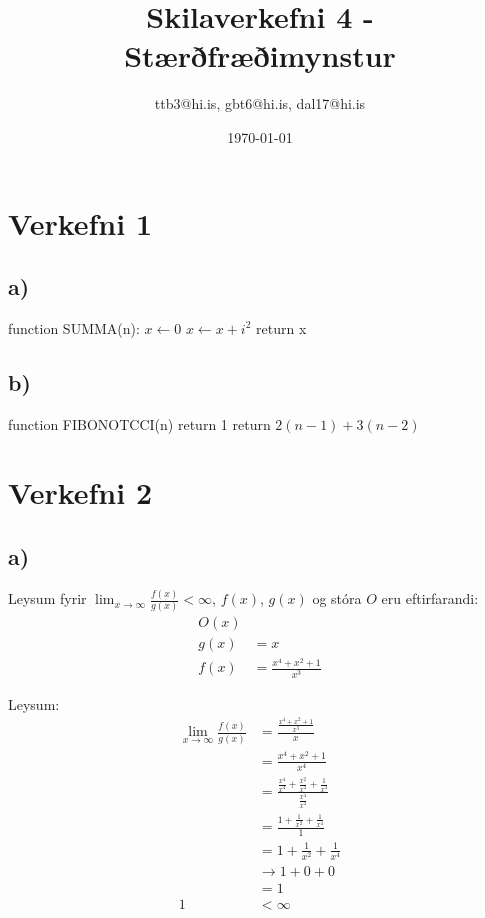 \documentclass{article}
\title{Skilaverkefni 4 - Stærðfræðimynstur}
\author{ttb3@hi.is, gbt6@hi.is, dal17@hi.is}
\date{\today}
\begin{document}
\maketitle

\section*{Verkefni 1}
\subsection*{a)}

\begin{algorithmic}
\State function SUMMA(n):
\State $x \gets 0$
    \State $x \gets x + i^2$
\EndFor
\State return x
\end{algorithmic}

\subsection*{b)}

\begin{algorithmic}
    \State function FIBONOTCCI(n)
        \State return 1
    \Else 
        \State return $2(n-1)+3(n-2)$
    \EndIf
\end{algorithmic}

\newpage
\section*{Verkefni 2}
\subsection*{a)}
Leysum fyrir $\lim_{x\to\infty} \frac{f(x)}{g(x)}<\infty$, $f(x)$, $g(x)$ og stóra $O$ eru eftirfarandi:
\begin{align*}
    O(x)\\
    g(x)&=x\\
    f(x)&=\frac{x^4+x^2+1}{x^3}
\end{align*}
    
Leysum:
\begin{align*}
    \lim_{x\to\infty} \frac{f(x)}{g(x)} 
    &= \frac{\frac{x^4+x^2+1}{x^3}}{x}\\
    &= \frac{x^4+x^2+1}{x^4}\\
    &= \frac{\frac{x^4}{x^4}+\frac{x^2}{x^4}+\frac{1}{x^4}}{\frac{x^4}{x^4}}\\
    &= \frac{1+\frac{1}{x^2}+\frac{1}{x^4}}{1}\\
    &= 1+\frac{1}{x^2}+\frac{1}{x^4}\\
    &\to 1+0+0\\
    &= 1\\
    1 &< \infty
\end{align*}
\end{document}
